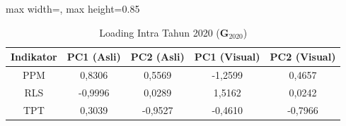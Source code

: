 \begin{table}[H]
\centering
\caption{Loading Intra Tahun 2020 ($\mathbf{G}_{2020}$)} \label{tab:sample1loading_intra_2020}
\begin{adjustbox}{max width=\textwidth, max height=0.85\textheight}
\begin{tabular}{|c|c|c|c|c|}
\hline
\textbf{Indikator} & \textbf{PC1 (Asli)} & \textbf{PC2 (Asli)} & \textbf{PC1 (Visual)} & \textbf{PC2 (Visual)} \\
\hline
PPM & 0,8306 & 0,5569 & -1,2599 & 0,4657 \\
RLS & -0,9996 & 0,0289 & 1,5162 & 0,0242 \\
TPT & 0,3039 & -0,9527 & -0,4610 & -0,7966 \\
\hline
\end{tabular}
\end{adjustbox}
\end{table}